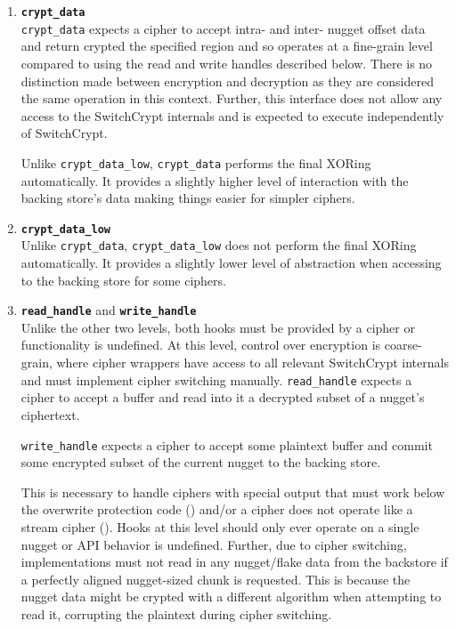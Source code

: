 \begin{enumerate}
   \item \textbf{\texttt{crypt\_data}}\\\texttt{crypt\_data}
   expects a cipher to accept intra- and inter- nugget offset data and return
   crypted the specified region and so operates at a fine-grain level compared
   to using the read and write handles described below. There is no distinction
   made between encryption and decryption as they are considered the same
   operation in this context. Further, this interface does not allow any access
   to the SwitchCrypt internals and is expected to execute independently of
   SwitchCrypt.

   Unlike \texttt{crypt\_data\_low}, \texttt{crypt\_data} performs the final
   XORing automatically. It provides a slightly higher level of interaction with
   the backing store's data making things easier for simpler ciphers.

   \item \textbf{\texttt{crypt\_data\_low}}\\Unlike \texttt{crypt\_data},
   \texttt{crypt\_data\_low} does not perform the final XORing automatically. It
   provides a slightly lower level of abstraction when accessing to the backing
   store for some ciphers.

   \item \textbf{\texttt{read\_handle}} and \textbf{\texttt{write\_handle}}\\
   Unlike the other two levels, both hooks must be provided by a cipher or
   functionality is undefined. At this level, control over encryption is
   coarse-grain, where cipher wrappers have access to all relevant SwitchCrypt
   internals and must implement cipher switching manually. \texttt{read\_handle}
   expects a cipher to accept a buffer and read into it a decrypted subset of a
   nugget's ciphertext.

   \texttt{write\_handle} expects a cipher to accept some plaintext buffer and
   commit some encrypted subset of the current nugget to the backing store.

   This is necessary to handle ciphers with special output that must work
   below the overwrite protection code () and/or a cipher does not
   operate like a stream cipher (). Hooks at this level should only
   ever operate on a single nugget or API behavior is undefined. Further, due to
   cipher switching, implementations must not read in any nugget/flake data from
   the backstore if a perfectly aligned nugget-sized chunk is requested. This is
   because the nugget data might be crypted with a different algorithm when
   attempting to read it, corrupting the plaintext during cipher switching.
\end{enumerate}

